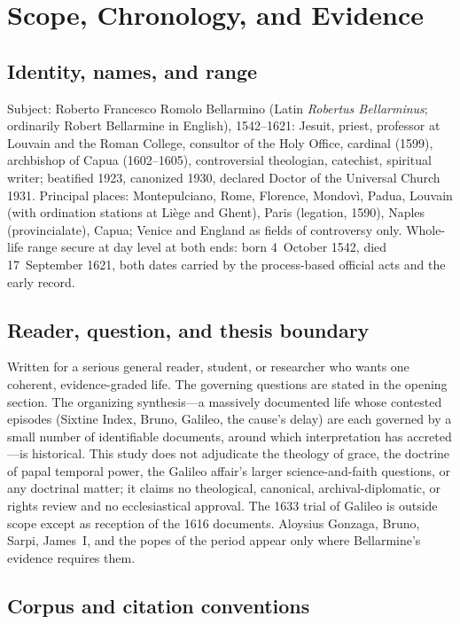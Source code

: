 \section{Scope, Chronology, and Evidence}

\subsection{Identity, names, and range}

Subject: Roberto Francesco Romolo Bellarmino (Latin \textit{Robertus
Bellarminus}; ordinarily Robert Bellarmine in English), 1542--1621:
Jesuit, priest, professor at Louvain and the Roman College,
consultor of the Holy Office, cardinal (1599), archbishop of Capua
(1602--1605), controversial theologian, catechist, spiritual
writer; beatified 1923, canonized 1930, declared Doctor of the
Universal Church 1931. Principal places: Montepulciano, Rome,
Florence, Mondov\`i, Padua, Louvain (with ordination stations at
Li\`ege and Ghent), Paris (legation, 1590), Naples (provincialate),
Capua; Venice and England as fields of controversy only. Whole-life
range secure at day level at both ends: born 4~October 1542, died
17~September 1621, both dates carried by the process-based official
acts and the early record.

\subsection{Reader, question, and thesis boundary}

Written for a serious general reader, student, or researcher who
wants one coherent, evidence-graded life. The governing questions
are stated in the opening section. The organizing synthesis---a
massively documented life whose contested episodes (Sixtine Index,
Bruno, Galileo, the cause's delay) are each governed by a small
number of identifiable documents, around which interpretation has
accreted---is historical. This study does not adjudicate the
theology of grace, the doctrine of papal temporal power, the
Galileo affair's larger science-and-faith questions, or any
doctrinal matter; it claims no theological, canonical,
archival-diplomatic, or rights review and no ecclesiastical
approval. The 1633 trial of Galileo is outside scope except as
reception of the 1616 documents. Aloysius Gonzaga, Bruno, Sarpi,
James~I, and the popes of the period appear only where Bellarmine's
evidence requires them.

\subsection{Corpus and citation conventions}

